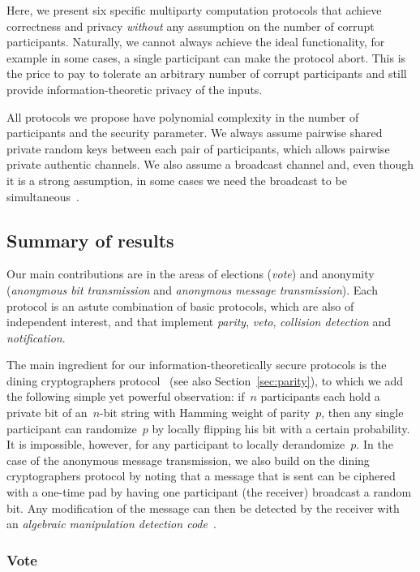 \documentclass[11pt]{article}
\begin{document}
Here, we present six specific multiparty computation protocols that
achieve  correctness  and privacy \emph{without} any assumption on
the number of corrupt participants. Naturally, we cannot always
achieve the ideal functionality, for example in some cases, a single
participant can make the protocol abort. This is the price to pay to
tolerate an arbitrary number of corrupt participants and still
provide information-theoretic privacy of the inputs.

All protocols we propose have polynomial complexity in the number of
participants and the security parameter. We always assume pairwise
shared private random keys between each pair of participants, which
allows pairwise private authentic channels. We also assume a
broadcast channel and, even though it is a strong assumption,  in
some cases we need the broadcast to be
simultaneous~\cite{CGMW85,HD05}.





\subsection{Summary of results}

Our main contributions are in the areas of elections (\emph{vote})
and anonymity (\emph{anonymous bit transmission} and \emph{anonymous
message transmission}). Each protocol is an astute combination of
basic protocols, which are also of independent interest, and that
implement \emph{parity}, \emph{veto}, \emph{collision detection} and
\emph{notification}.

The main ingredient for our information-theoretically  secure
protocols is the dining cryptographers protocol~\cite{Chaum88} (see
also Section~\ref{sec:parity}), to which we add the following simple
yet powerful observation: if~$n$ participants each hold a private
bit of an~$n$-bit string with Hamming weight of parity~$p$, then any
single participant can randomize~$p$ by locally flipping his bit
with a certain probability. It is impossible, however, for any
participant to locally derandomize~$p$. In the case of the anonymous
message transmission, we also build on the dining cryptographers
protocol by noting that a message that is sent  can be ciphered with
a one-time pad by having one participant (the receiver) broadcast a
random bit. Any modification of the message can then be detected by
the receiver with an \emph{algebraic manipulation detection
code}~\cite{CFP07}.


\subsubsection{Vote}
\end{document}

